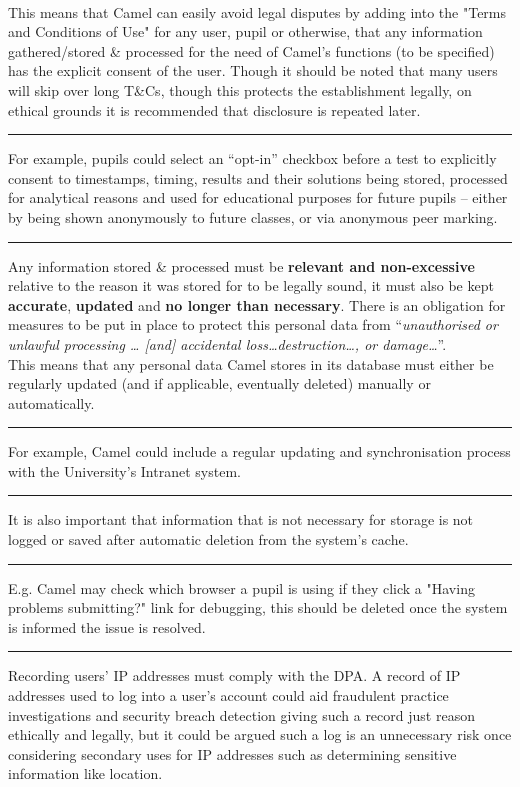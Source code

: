 \\This means that Camel can easily avoid legal disputes by adding into the "Terms and Conditions of Use" for any user, pupil or otherwise, that any information gathered/stored \& processed for the need of Camel’s functions (to be specified) has the explicit consent of the user. Though it should be noted that many users will skip over long T\&Cs, though this protects the establishment legally, on ethical grounds it is recommended that disclosure is repeated later.
\vspace{0.35cm} \hrule {\raggedleft \scriptsize For example, pupils could select an “opt-in” checkbox before a test to explicitly consent to timestamps, timing, results and their solutions being stored, processed for analytical reasons and used for educational purposes for future pupils -- either by being shown anonymously  to future classes, or via anonymous peer marking.\par} \vspace{0.35cm} \hrule
Any information stored \& processed must be \textbf{relevant and non-excessive} relative to the reason it was stored for to be legally sound, it must also be kept \textbf{accurate}, \textbf{updated} and \textbf{no longer than necessary}. There is an obligation for measures to be put in place to protect this personal data from “\textit{unauthorised or unlawful processing … [and] accidental loss\ldots destruction\ldots, or damage\ldots}”\cite{DPA:tDPP:S1}.
\\This means that any personal data Camel stores in its database must either be regularly updated (and if applicable, eventually deleted) manually or automatically.
\vspace{0.35cm} \hrule {\raggedleft \scriptsize For example, Camel could include a regular updating and synchronisation process with the University's Intranet system. \par} \vspace{0.35cm} \hrule
It is also important that information that is not necessary for storage is not logged or saved after automatic deletion from the system’s cache.
\vspace{0.35cm} \hrule {\raggedleft \scriptsize E.g. Camel may check which browser a pupil is using if they click a "Having problems submitting?" link for debugging, this should be deleted once the system is informed the issue is resolved. \par} \vspace{0.35cm} \hrule
Recording users' IP addresses must comply with the DPA. A record of IP addresses used to log into a user's account could aid fraudulent practice investigations and security breach detection giving such a record just reason ethically and legally, but it could be argued such a log is an unnecessary risk once considering secondary uses for IP addresses such as determining sensitive information like location.
